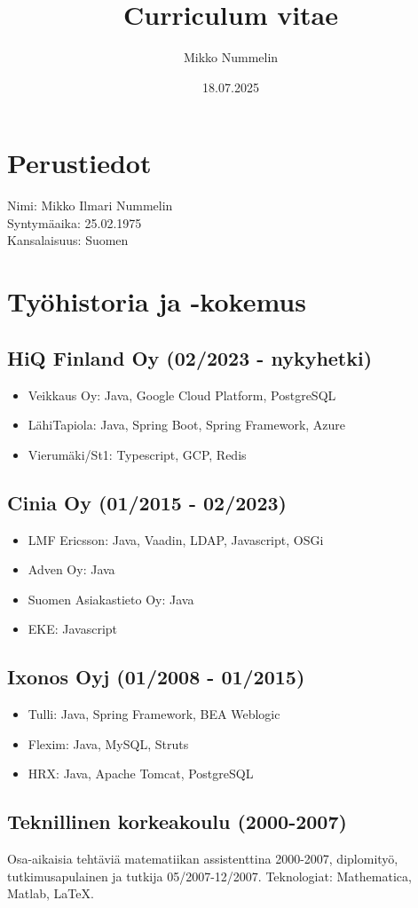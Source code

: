 \documentclass[a4paper,12pt]{article}
\title{Curriculum vitae}
\author{Mikko Nummelin}
\date{18.07.2025}
\begin{document}
\maketitle
\section*{Perustiedot}
Nimi: Mikko Ilmari Nummelin \\
Syntymäaika: 25.02.1975 \\
Kansalaisuus: Suomen
\section*{Työhistoria ja -kokemus}
\subsection*{HiQ Finland Oy (02/2023 - nykyhetki)}
\begin{itemize}
\item{Veikkaus Oy: Java, Google Cloud Platform, PostgreSQL}
\item{LähiTapiola: Java, Spring Boot, Spring Framework, Azure}
\item{Vierumäki/St1: Typescript, GCP, Redis}
\end{itemize}
\subsection*{Cinia Oy (01/2015 - 02/2023)}
\begin{itemize}
\item{LMF Ericsson: Java, Vaadin, LDAP, Javascript, OSGi}
\item{Adven Oy: Java}
\item{Suomen Asiakastieto Oy: Java}
\item{EKE: Javascript}
\end{itemize}
\subsection*{Ixonos Oyj (01/2008 - 01/2015)}
\begin{itemize}
\item{Tulli: Java, Spring Framework, BEA Weblogic}
\item{Flexim: Java, MySQL, Struts}
\item{HRX: Java, Apache Tomcat, PostgreSQL}
\end{itemize}
\subsection*{Teknillinen korkeakoulu (2000-2007)}
Osa-aikaisia tehtäviä matematiikan assistenttina 2000-2007, diplomityö, tutkimusapulainen ja tutkija 05/2007-12/2007. Teknologiat: Mathematica, Matlab, LaTeX.
\end{document}
